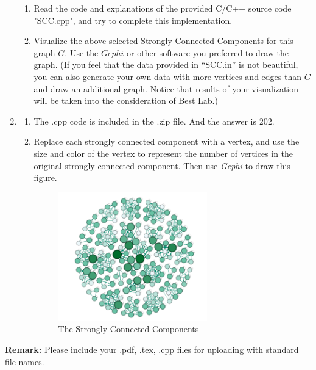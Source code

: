 \documentclass[12pt,a4paper]{article}
\makeatletter
\newtheorem*{solution}{Solution}
\theoremstyle{definition}
\renewenvironment{solution}[1][Solution] {\par\pushQED{\qed}\normalfont\topsep6\p@\@plus6\p@\relax\trivlist\item[\hskip\labelsep\bfseries#1\@addpunct{.}]\ignorespaces}{\popQED\endtrivlist\@endpefalse} \makeatother
\makeatother
\begin{document}
\begin{enumerate}
    \begin{enumerate}
    	\item Read the code and explanations of the provided C/C++ source code "SCC.cpp", and try to complete this implementation.
    	\item Visualize the above selected Strongly Connected Components for this graph $G$. Use the $Gephi$ or other software you preferred to draw the graph. {\color{blue}(If you feel that the data provided in ``SCC.in'' is not beautiful, you can also generate your own data with more vertices and edges than $G$ and draw an additional graph. Notice that results of your visualization will be taken into the consideration of Best Lab.)}
    \end{enumerate}	
	\begin{solution}
		\begin{enumerate}
			\item The .cpp code is included in the .zip file. And the answer is 202.
			\item Replace each strongly connected component with a vertex, and use the size and color of the vertex to represent the number of vertices in the original strongly connected component. Then use \textit{Gephi} to draw this figure.			
			\begin{figure}[H]
				\centering
				\includegraphics[width=0.65\textwidth]{scc.png}
				\caption{The Strongly Connected Components}
			\end{figure}
		\end{enumerate}
	\end{solution}
\end{enumerate}



\textbf{Remark:} Please include your .pdf, .tex, .cpp files for uploading with standard file names.
\newpage


\end{document}
